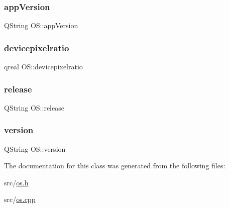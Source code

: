 \subsubsection{\texorpdfstring{appVersion}{appVersion}}
{\footnotesize\ttfamily Q\+String O\+S\+::app\+Version\hspace{0.3cm}{\ttfamily [read]}}

\mbox{\label{classOS_aa40d035f4f4b1f67c6c103cd3b3cfc08}} 
\subsubsection{\texorpdfstring{devicepixelratio}{devicepixelratio}}
{\footnotesize\ttfamily qreal O\+S\+::devicepixelratio\hspace{0.3cm}{\ttfamily [read]}}

\mbox{\label{classOS_ac78395d05ca770df0e6136dca18cf682}} 
\subsubsection{\texorpdfstring{release}{release}}
{\footnotesize\ttfamily Q\+String O\+S\+::release\hspace{0.3cm}{\ttfamily [read]}}

\mbox{\label{classOS_af9d3ad8c99dd34d874634eae3163dcc3}} 
\subsubsection{\texorpdfstring{version}{version}}
{\footnotesize\ttfamily Q\+String O\+S\+::version\hspace{0.3cm}{\ttfamily [read]}}



The documentation for this class was generated from the following files\+:\begin{DoxyCompactItemize}
\item 
src/\mbox{\hyperlink{os_8h}{os.\+h}}\item 
src/\mbox{\hyperlink{os_8cpp}{os.\+cpp}}\end{DoxyCompactItemize}
